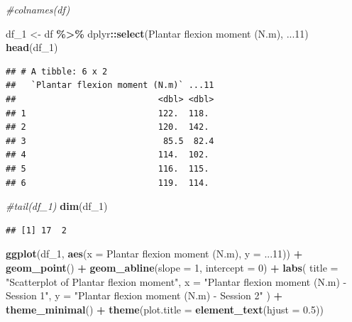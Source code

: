\documentclass[
]{book}
\newenvironment{Shaded}{\begin{snugshade}}{\end{snugshade}}
\newcommand{\AttributeTok}[1]{\textcolor[rgb]{0.13,0.29,0.53}{#1}}
\newcommand{\CommentTok}[1]{\textcolor[rgb]{0.56,0.35,0.01}{\textit{#1}}}
\newcommand{\DecValTok}[1]{\textcolor[rgb]{0.00,0.00,0.81}{#1}}
\newcommand{\FloatTok}[1]{\textcolor[rgb]{0.00,0.00,0.81}{#1}}
\newcommand{\FunctionTok}[1]{\textcolor[rgb]{0.13,0.29,0.53}{\textbf{#1}}}
\newcommand{\NormalTok}[1]{#1}
\newcommand{\OtherTok}[1]{\textcolor[rgb]{0.56,0.35,0.01}{#1}}
\newcommand{\SpecialCharTok}[1]{\textcolor[rgb]{0.81,0.36,0.00}{\textbf{#1}}}
\newcommand{\StringTok}[1]{\textcolor[rgb]{0.31,0.60,0.02}{#1}}
\begin{document}
\begin{Shaded}
\begin{Highlighting}[]
\CommentTok{\#colnames(df)}

\NormalTok{df\_1 }\OtherTok{\textless{}{-}}\NormalTok{ df }\SpecialCharTok{\%\textgreater{}\%}\NormalTok{ dplyr}\SpecialCharTok{::}\FunctionTok{select}\NormalTok{(}\StringTok{\textasciigrave{}}\AttributeTok{Plantar flexion moment (N.m)}\StringTok{\textasciigrave{}}\NormalTok{, }\StringTok{\textasciigrave{}}\AttributeTok{...11}\StringTok{\textasciigrave{}}\NormalTok{)}
\FunctionTok{head}\NormalTok{(df\_1)}
\end{Highlighting}
\end{Shaded}

\begin{verbatim}
## # A tibble: 6 x 2
##   `Plantar flexion moment (N.m)` ...11
##                            <dbl> <dbl>
## 1                          122.  118. 
## 2                          120.  142. 
## 3                           85.5  82.4
## 4                          114.  102. 
## 5                          116.  115. 
## 6                          119.  114.
\end{verbatim}

\begin{Shaded}
\begin{Highlighting}[]
\CommentTok{\#tail(df\_1)}
\FunctionTok{dim}\NormalTok{(df\_1)}
\end{Highlighting}
\end{Shaded}

\begin{verbatim}
## [1] 17  2
\end{verbatim}

\begin{Shaded}
\begin{Highlighting}[]
\FunctionTok{ggplot}\NormalTok{(df\_1, }\FunctionTok{aes}\NormalTok{(}\AttributeTok{x =} \StringTok{\textasciigrave{}}\AttributeTok{Plantar flexion moment (N.m)}\StringTok{\textasciigrave{}}\NormalTok{, }\AttributeTok{y =} \StringTok{\textasciigrave{}}\AttributeTok{...11}\StringTok{\textasciigrave{}}\NormalTok{)) }\SpecialCharTok{+}
  \FunctionTok{geom\_point}\NormalTok{() }\SpecialCharTok{+}
  \FunctionTok{geom\_abline}\NormalTok{(}\AttributeTok{slope =} \DecValTok{1}\NormalTok{, }\AttributeTok{intercept =} \DecValTok{0}\NormalTok{) }\SpecialCharTok{+}
  \FunctionTok{labs}\NormalTok{(}
    \AttributeTok{title =} \StringTok{"Scatterplot of Plantar flexion moment"}\NormalTok{,}
    \AttributeTok{x =} \StringTok{"Plantar flexion moment (N.m) {-} Session 1"}\NormalTok{,}
    \AttributeTok{y =} \StringTok{"Plantar flexion moment (N.m) {-} Session 2"}
\NormalTok{  ) }\SpecialCharTok{+}
  \FunctionTok{theme\_minimal}\NormalTok{() }\SpecialCharTok{+} 
  \FunctionTok{theme}\NormalTok{(}\AttributeTok{plot.title =} \FunctionTok{element\_text}\NormalTok{(}\AttributeTok{hjust =} \FloatTok{0.5}\NormalTok{))}
\end{Highlighting}
\end{Shaded}
\end{document}
